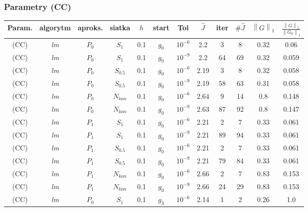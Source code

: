 \documentclass[11pt]{article}
\newcommand{\norm}[1]{\left\lVert#1\right\rVert}
\begin{document}
\subsubsection{Parametry (CC)}

\begin{table}[h]
  \begin{center}
    \begin{tabular}{|c|c|c|c|c|c|c||c|c|c|c|c|}
      \hline
      Param. & algorytm & aproks. & siatka & $h$ & start & Tol & $\hat{J}$ & iter & $\#\hat{J}$ & $\norm{G}_1$ & $\frac{\norm{G}_1}{\norm{G_0}_1}$ \\
      \hline
      (CC) & {\it lm\/} & $P_0$ & $S_1$ & 0.1 & $g_0$ & $10^{-6}$ & 2.2 & 3 & 8 & 0.32 & 0.06 \\
      \hline
      (CC) & {\it lm\/} & $P_0$ & $S_1$ & 0.1 & $g_0$ & $10^{-9}$ & 2.2 & 64 & 69 & 0.32 & 0.059 \\
      \hline
      (CC) & {\it lm\/} & $P_0$ & $S_{0.5}$ & 0.1 & $g_0$ & $10^{-6}$ & 2.19 & 3 & 8 & 0.32 & 0.058 \\
      \hline
      (CC) & {\it lm\/} & $P_0$ & $S_{0.5}$ & 0.1 & $g_0$ & $10^{-9}$ & 2.19 & 58 & 63 & 0.31 & 0.058 \\
      \hline
      (CC) & {\it lm\/} & $P_0$ & $N_{kon}$ & 0.1 & $g_0$ & $10^{-6}$ & 2.64 & 9 & 14 & 0.8 & 0.148 \\
      \hline
      (CC) & {\it lm\/} & $P_0$ & $N_{kon}$ & 0.1 & $g_0$ & $10^{-9}$ & 2.63 & 87 & 92 & 0.8 & 0.147 \\
      \hline
      (CC) & {\it lm\/} & $P_1$ & $S_1$ & 0.1 & $g_0$ & $10^{-6}$ & 2.21 & 2 & 7 & 0.33 & 0.061 \\
      \hline
      (CC) & {\it lm\/} & $P_1$ & $S_1$ & 0.1 & $g_0$ & $10^{-9}$ & 2.21 & 89 & 94 & 0.33 & 0.061 \\
      \hline
      (CC) & {\it lm\/} & $P_1$ & $S_{0.5}$ & 0.1 & $g_0$ & $10^{-6}$ & 2.21 & 2 & 7 & 0.33 & 0.061 \\
      \hline
      (CC) & {\it lm\/} & $P_1$ & $S_{0.5}$ & 0.1 & $g_0$ & $10^{-9}$ & 2.21 & 79 & 84 & 0.33 & 0.061 \\
      \hline
      (CC) & {\it lm\/} & $P_1$ & $N_{kon}$ & 0.1 & $g_0$ & $10^{-6}$ & 2.66 & 2 & 7 & 0.83 & 0.153 \\
      \hline
      (CC) & {\it lm\/} & $P_1$ & $N_{kon}$ & 0.1 & $g_0$ & $10^{-9}$ & 2.66 & 24 & 29 & 0.83 & 0.153 \\
      \hline
      (CC) & {\it lm\/} & $P_0$ & $S_1$ & 0.1 & $g_3$ & $10^{-6}$ & 2.14 & 1 & 2 & 0.26 & 1.0 \\

\end{tabular}
\end{center}
\end{table}
\end{document}
